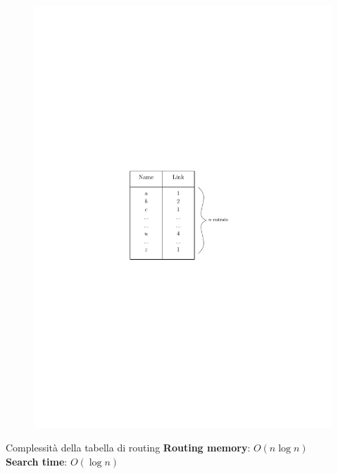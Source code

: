 \documentclass[10pt,xcolor=dvipsnames]{beamer}
\begin{document}
\begin{frame}
	\frametitle{}
	
	\begin{figure}[h]
	\centering
	\includegraphics[scale=0.8]{routing_table.pdf}
	\end{figure}

	\vfill 
	\begin{block}{Complessità della tabella di routing}
		\textbf{Routing memory}: $O(n\log n)$\\
		\textbf{Search time}: $O(\log n)$
	\end{block}
\end{frame}
\end{document}

